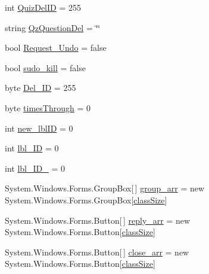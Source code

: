 \begin{DoxyCompactItemize}
\item 
int \hyperlink{class_sr_p___classroom_inq_1_1frm_classrrom_inq_a2221a860fdb3bc2837b3ca3c0cee182c}{\-Quiz\-Del\-I\-D} = 255
\item 
string \hyperlink{class_sr_p___classroom_inq_1_1frm_classrrom_inq_a1fe88369748706492ccc7292a0e47331}{\-Qz\-Question\-Del} = \char`\"{}\char`\"{}
\item 
bool \hyperlink{class_sr_p___classroom_inq_1_1frm_classrrom_inq_acb5bab8dcbcbfc8ed7a5b260ddba84e3}{\-Request\-\_\-\-Undo} = false
\item 
bool \hyperlink{class_sr_p___classroom_inq_1_1frm_classrrom_inq_a3ac2217a30904b65be786ee00a312fea}{sudo\-\_\-kill} = false
\item 
byte \hyperlink{class_sr_p___classroom_inq_1_1frm_classrrom_inq_a9874b3534409b79a483f08f2aa03668d}{\-Del\-\_\-\-I\-D} = 255
\item 
byte \hyperlink{class_sr_p___classroom_inq_1_1frm_classrrom_inq_ab730336bf81938256d6f20922c15484b}{times\-Through} = 0
\item 
int \hyperlink{class_sr_p___classroom_inq_1_1frm_classrrom_inq_a561cfd5c0d34d4adcb14aee4efc01643}{new\-\_\-lbl\-I\-D} = 0
\item 
int \hyperlink{class_sr_p___classroom_inq_1_1frm_classrrom_inq_a15d44adc56e5e6523bfadd27d9966935}{lbl\-\_\-\-I\-D} = 0
\item 
int \hyperlink{class_sr_p___classroom_inq_1_1frm_classrrom_inq_a5d14fbec9e02ebe6942d26ae8ed53d3b}{lbl\-\_\-\-I\-D\-\_} = 0
\item 
\-System.\-Windows.\-Forms.\-Group\-Box\mbox{[}$\,$\mbox{]} \hyperlink{class_sr_p___classroom_inq_1_1frm_classrrom_inq_a68d2b307c87e71592f6e170c9ce2aad2}{group\-\_\-arr} = new \-System.\-Windows.\-Forms.\-Group\-Box\mbox{[}\hyperlink{class_sr_p___classroom_inq_1_1frm_classrrom_inq_a78d9aab335edfe53d39036b9d89928a8}{class\-Size}\mbox{]}
\item 
\-System.\-Windows.\-Forms.\-Button\mbox{[}$\,$\mbox{]} \hyperlink{class_sr_p___classroom_inq_1_1frm_classrrom_inq_a46ee30d934a5219840e4381a66728f0f}{reply\-\_\-arr} = new \-System.\-Windows.\-Forms.\-Button\mbox{[}\hyperlink{class_sr_p___classroom_inq_1_1frm_classrrom_inq_a78d9aab335edfe53d39036b9d89928a8}{class\-Size}\mbox{]}
\item 
\-System.\-Windows.\-Forms.\-Button\mbox{[}$\,$\mbox{]} \hyperlink{class_sr_p___classroom_inq_1_1frm_classrrom_inq_a4758f35d344b79b972e88a42cb660904}{close\-\_\-arr} = new \-System.\-Windows.\-Forms.\-Button\mbox{[}\hyperlink{class_sr_p___classroom_inq_1_1frm_classrrom_inq_a78d9aab335edfe53d39036b9d89928a8}{class\-Size}\mbox{]}

\end{DoxyCompactItemize}
